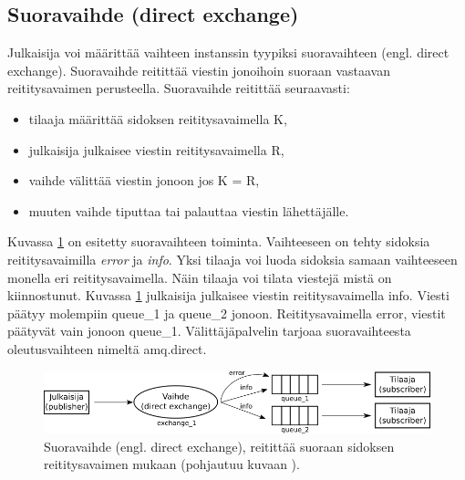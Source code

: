 \subsection{Suoravaihde (direct exchange)}
Julkaisija voi määrittää vaihteen instanssin tyypiksi suoravaihteen (engl. direct exchange). Suoravaihde reitittää viestin jonoihoin suoraan vastaavan reititysavaimen perusteella. Suoravaihde reitittää seuraavasti:
\begin{itemize}
	\item tilaaja määrittää sidoksen reititysavaimella K,
	\item julkaisija julkaisee viestin reititysavaimella R,
	\item vaihde välittää viestin jonoon jos K = R,
	\item muuten vaihde tiputtaa tai palauttaa viestin lähettäjälle.
\end{itemize}
Kuvassa \ref{fig:amqp-direct-exchange} on esitetty suoravaihteen toiminta. Vaihteeseen on tehty sidoksia reititysavaimilla \emph{error} ja \emph{info}. Yksi tilaaja voi luoda sidoksia samaan vaihteeseen monella eri reititysavaimella. Näin tilaaja voi tilata viestejä mistä on kiinnostunut. Kuvassa \ref{fig:amqp-direct-exchange} julkaisija julkaisee viestin reititysavaimella info. Viesti päätyy molempiin queue\_1 ja queue\_2 jonoon. Reititysavaimella error, viestit päätyvät vain jonoon queue\_1. Välittäjäpalvelin tarjoaa suoravaihteesta oleutusvaihteen nimeltä amq.direct. \cite[s.~27]{AMQP-specification}

\begin{figure}
	\includegraphics[width=1\textwidth]{pictures/amqp-direct-exchange.png}
	\caption{Suoravaihde (engl. direct exchange), reitittää suoraan sidoksen reititysavaimen mukaan (pohjautuu kuvaan \cite{RabbitMQ-Tutorial-Routing}).}
	\label{fig:amqp-direct-exchange}
\end{figure}


